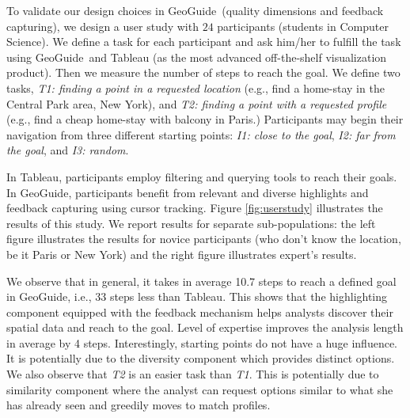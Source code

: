 \documentclass{vldb}
\newcommand{\framework}{{\sc GeoGuide}}
\begin{document}

To validate our design choices in \framework\ (quality dimensions and feedback capturing), we design a user study with $24$ participants (students in Computer Science). We define a task for each participant and ask him/her to fulfill the task using \framework\ and {\sc Tableau} (as the most advanced off-the-shelf visualization product). Then we measure the number of steps to reach the goal. We define two tasks, {\em T1: finding a point in a requested location} (e.g., find a home-stay in the Central Park area, New York), and {\em T2: finding a point with a requested profile} (e.g., find a cheap home-stay with balcony in Paris.) Participants may begin their navigation from three different starting points: {\em I1: close to the goal}, {\em I2: far from the goal}, and {\em I3: random}. 

In {\sc Tableau}, participants employ filtering and querying tools to reach their goals. In \framework, participants benefit from relevant and diverse highlights and feedback capturing using cursor tracking. Figure \ref{fig:userstudy} illustrates the results of this study. We report results for separate sub-populations: the left figure illustrates the results for novice participants (who don't know the location, be it Paris or New York) and the right figure illustrates expert's results.

We observe that in general, it takes in average 10.7 steps to reach a defined goal in \framework, i.e., 33 steps less than {\sc Tableau}. This shows that the highlighting component equipped with the feedback mechanism helps analysts discover their spatial data and reach to the goal. Level of expertise improves the analysis length in average by 4 steps. Interestingly, starting points do not have a huge influence. It is potentially due to the diversity component which provides distinct options. We also observe that {\em T2} is an easier task than {\em T1}. This is potentially due to similarity component where the analyst can request options similar to what she has already seen and greedily moves to match profiles.
\end{document}
